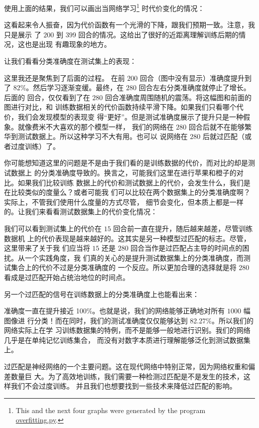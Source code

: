 使用上面的结果，我们可以画出当网络学习\footnote{This and the next four graphs
  were generated by the program
  \href{https://github.com/mnielsen/neural-networks-and-deep-learning/blob/master/fig/overfitting.py}{overfitting.py}.}
时代价变化的情况：

这看起来令人振奋，因为代价函数有一个光滑的下降，跟我们预期一致。注意，我只是展示
了 $200$ 到 $399$ 回合的情况。这给出了很好的近距离理解训练后期的情况，这也是出现
有趣现象的地方。

让我们看看分类准确度在测试集上的表现：

这里我还是聚焦到了后面的过程。 在前 $200$ 回合（图中没有显示）准确度提升到
了 82\%。然后学习逐渐变缓。最终，在 $280$ 回合左右分类准确度就停止了增长。后面的
回合，仅仅看到了在 $280$ 回合准确度周围随机的震荡。将这幅图和前面的图进行对比，和
训练数据相关的代价函数持续平滑下降。如果我们只看哪个代价，我们会发现模型的表现变
得“更好”。但是测试准确度展示了提升只是一种假象。就像费米不大喜欢的那个模型一样，
我们的网络在 $280$ 回合后就不在能够繁华到测试数据上。所以这种学习不大有用。也可以
说网络在 $280$ 后就过匹配（或者过度训练）了。

你可能想知道这里的问题是不是由于我们看的是训练数据的代价，而对比的却是测试数据上
的分类准确度导致的。换言之，可能我们这里在进行苹果和橙子的对比。如果我们比较训练
数据上的代价和测试数据上的代价，会发生什么，我们是在比较类似的度量么？或者可能我
们可以比较在两个数据集上的分类准确度啊？实际上，不管我们使用什么度量的方式尽管，
细节会变化，但本质上都是一样的。让我们来看看测试数据集上的代价变化情况：

我们可以看到测试集上的代价在 $15$ 回合前一直在提升，随后越来越差，尽管训练数据机
上的代价表现是越来越好的。这其实是另一种模型过匹配的标志。尽管，这里带来了关于我
们应当将 $15$ 还是 $280$ 回合当作是过匹配占主导的时间点的困扰。从一个实践角度，我
们真的关心的是提升测试数据集上的分类准确度，而测试集合上的代价不过是分类准确度的
一个反应。所以更加合理的选择就是将 $280$ 看成是过匹配开始占统治地位的时间点。

另一个过匹配的信号在训练数据上的分类准确度上也能看出来：

准确度一直在提升接近 100\%。也就是说，我们的网络能够正确地对所有 $1000$ 幅图像进
行分类！而在同时，我们的测试准确度仅仅能够达到 82.27\%。所以我们的网络实际上在学
习训练数据集的特例，而不是能够一般地进行识别。我们的网络几乎是在单纯记忆训练集合，
而没有对数字本质进行理解能够泛化到测试数据集上。

过匹配是神经网络的一个主要问题。这在现代网络中特别正常，因为网络权重和偏差数量巨
大。为了高效地训练，我们需要一种检测过匹配是不是发生的技术，这样我们不会过度训练。
并且我们也想要找到一些技术来降低过匹配的影响。

